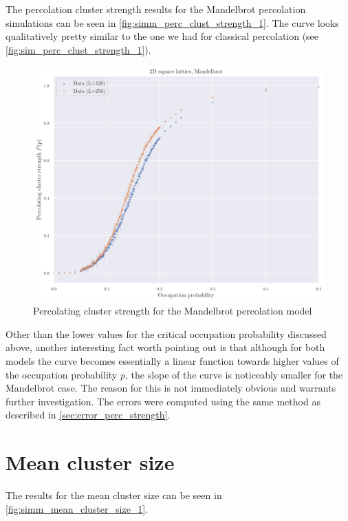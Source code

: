 The percolation cluster strength results for the Mandelbrot percolation simulations can be seen in \autoref{fig:simm_perc_clust_strength_1}. The curve looks qualitatively pretty similar to the one we had for classical percolation (see \autoref{fig:sim_perc_clust_strength_1}).


\begin{figure}[H]
  \includegraphics[width=\linewidth]{Images/simm_perc_clust_strength_1.png}
  \caption{Percolating cluster strength for the Mandelbrot percolation model}
  \label{fig:simm_perc_clust_strength_1}
\end{figure}

Other than the lower values for the critical occupation probability discussed above, another interesting fact worth pointing out is that although for both models the curve becomes essentially a linear function towards higher values of the occupation probability $p$, the slope of the curve is noticeably smaller for the Mandelbrot case. The reason for this is not immediately obvious and warrants further investigation.
The errors were computed using the same method as described in  \autoref{sec:error_perc_strength}.
\section{Mean cluster size}

The results for the mean cluster size can be seen in \autoref{fig:simm_mean_cluster_size_1}. 

